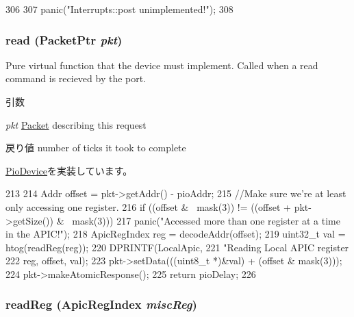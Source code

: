 \begin{DoxyCode}
306     {
307         panic("Interrupts::post unimplemented!\n");
308     }
\end{DoxyCode}
\hypertarget{classX86ISA_1_1Interrupts_a613ec7d5e1ec64f8d21fec78ae8e568e}{
\subsubsection[{read}]{ read ({\bf PacketPtr} {\em pkt})}}
\label{classX86ISA_1_1Interrupts_a613ec7d5e1ec64f8d21fec78ae8e568e}
Pure virtual function that the device must implement. Called when a read command is recieved by the port. 
\begin{DoxyParams}{引数}
\item[{\em pkt}]\hyperlink{classPacket}{Packet} describing this request \end{DoxyParams}
\begin{DoxyReturn}{戻り値}
number of ticks it took to complete 
\end{DoxyReturn}


\hyperlink{classPioDevice_a842312590432036092c422c87a442358}{PioDevice}を実装しています。


\begin{DoxyCode}
213 {
214     Addr offset = pkt->getAddr() - pioAddr;
215     //Make sure we're at least only accessing one register.
216     if ((offset & ~mask(3)) != ((offset + pkt->getSize()) & ~mask(3)))
217         panic("Accessed more than one register at a time in the APIC!\n");
218     ApicRegIndex reg = decodeAddr(offset);
219     uint32_t val = htog(readReg(reg));
220     DPRINTF(LocalApic,
221             "Reading Local APIC register %
222             reg, offset, val);
223     pkt->setData(((uint8_t *)&val) + (offset & mask(3)));
224     pkt->makeAtomicResponse();
225     return pioDelay;
226 }
\end{DoxyCode}
\hypertarget{classX86ISA_1_1Interrupts_a505f3b9c44f3e911ac16a833289d72d6}{
\subsubsection[{readReg}]{ readReg ({\bf ApicRegIndex} {\em miscReg})}}
\label{classX86ISA_1_1Interrupts_a505f3b9c44f3e911ac16a833289d72d6}



